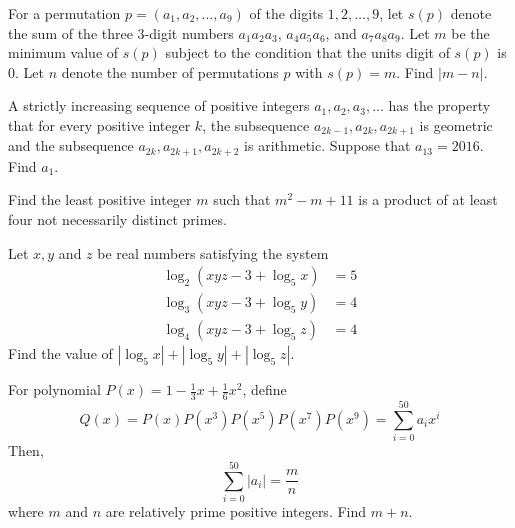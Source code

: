 \documentclass[problems.tex]{subfile}
\begin{document}
	\begin{problem}
		For a permutation $p = (a_1,a_2,\ldots,a_9)$ of the digits $1,2,\ldots,9$, let $s(p)$ denote the sum of the three $3$-digit numbers $a_1a_2a_3$, $a_4a_5a_6$, and $a_7a_8a_9$. Let $m$ be the minimum value of $s(p)$ subject to the condition that the units digit of $s(p)$ is $0$. Let $n$ denote the number of permutations $p$ with $s(p) = m$. Find $|m - n|$. %
	\end{problem}

	\begin{problem}
		A strictly increasing sequence of positive integers $a_1, a_2, a_3, \ldots$ has the property that for every positive integer $k$, the subsequence $a_{2k-1}, a_{2k}, a_{2k+1}$ is geometric and the subsequence $a_{2k}, a_{2k+1}, a_{2k+2}$ is arithmetic. Suppose that $a_{13} = 2016$. Find $a_1$. %
	\end{problem}

	\begin{problem}
		Find the least positive integer $m$ such that $m^2 - m + 11$ is a product of at least four not necessarily distinct primes. %
	\end{problem}

	\begin{problem}
		Let $x,y$ and $z$ be real numbers satisfying the system \begin{align*} \log_2(xyz-3+\log_5 x) &= 5\\ \log_3(xyz-3+\log_5 y) &= 4 \\ \log_4(xyz-3+\log_5 z) &= 4 \end{align*}Find the value of $|\log_5 x|+|\log_5 y|+|\log_5 z|$. %
	\end{problem}

	\begin{problem}
		For polynomial $P(x)=1-\frac{1}{3}x+\frac{1}{6}x^2$, define \[ Q(x) = P(x)P(x^3)P(x^5)P(x^7)P(x^9) = \sum\limits_{i=0}^{50}a_ix^i \]Then, \[\sum\limits_{i=0}^{50}|a_i|=\frac{m}{n}\] where $m$ and $n$ are relatively prime positive integers. Find $m+n$. %
	\end{problem}
\end{document}

